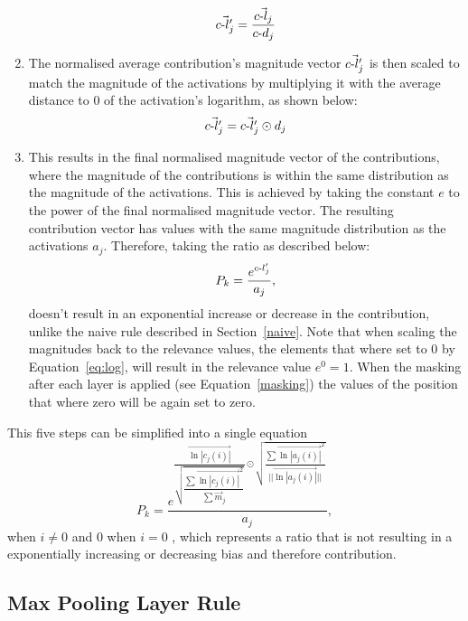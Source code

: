 \begin{enumerate}
\begin{equation}
\vec{\text{$c$-}l_{j}^\prime}= \dfrac{\vec{\text{$c$-}l_{j}}}{\text{$c$-}d_{j}}
\end{equation}
\item
The normalised average contribution's magnitude vector $\vec{\text{$c$-}l_{j}^\prime}$ is then scaled to match the magnitude of the activations by multiplying it with the average distance to 0 of the activation's logarithm, as shown below:
\begin{equation}
\vec{\text{$c$-}l_{j}^\prime} = \vec{\text{$c$-}l_{j}^\prime} \odot d_{j}
\end{equation}
\item This results in the final normalised magnitude vector of the contributions, where the magnitude of the contributions is within the same distribution as the magnitude of the activations. This is achieved by taking the constant $e$ to the power of the final normalised magnitude vector. The resulting contribution vector has values with the same magnitude distribution as the activations $a_j$. Therefore, taking the ratio as described below:
\begin{equation}
P_k = \dfrac{e^{\text{$c$-}l_{j}^\prime}}{a_j}, 
\end{equation}
doesn't result in an exponential increase or decrease in the contribution, unlike the naive rule described in Section~\ref{naive}.
\newline
\newline
Note that when scaling the magnitudes back to the relevance values, the elements that where set to 0 by Equation~\ref{eq:log}, will result in the relevance value $e^0 = 1$. When the masking after each layer is applied (see Equation~\ref{masking}) the values of the position that where zero will be again set to zero.
\end{enumerate}
This five steps can be simplified into a single equation 
\begin{equation}
\label{eq:ratio}
P_k = \dfrac{
e^{
\dfrac{\vec{\ln |c_j(i)|}}{\sqrt{\dfrac{\sum \vec{\ln |c_j(i)|}^2}{\sum \vec{m}_j}}} 
\odot
\sqrt{\dfrac{\sum \vec{\ln |a_j(i)|}^2}{||\vec{\ln|a_j(i)|}||}}
}
}{a_j}, 
\end{equation}
when $i \not= 0$ and 0 when $i = 0$ , which represents a ratio that is not resulting in a exponentially increasing or decreasing bias and therefore contribution.


\subsection{Max Pooling Layer Rule}

